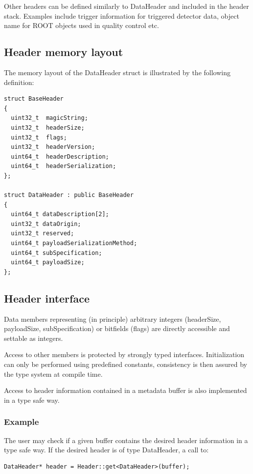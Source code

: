 \documentclass[a4paper,twoside]{article}
\begin{document}
Other headers can be defined similarly to DataHeader and included in the header stack. Examples include trigger information for triggered detector data, object name for ROOT objects used in quality control etc.

\subsection{Header memory layout}
The memory layout of the DataHeader struct is illustrated by the following definition:

\lstset{language=C++
}
\begin{lstlisting}
struct BaseHeader
{
  uint32_t  magicString;
  uint32_t  headerSize;
  uint32_t  flags;
  uint32_t  headerVersion;
  uint64_t  headerDescription;
  uint64_t  headerSerialization;
};

struct DataHeader : public BaseHeader
{
  uint64_t dataDescription[2];
  uint32_t dataOrigin;
  uint32_t reserved;
  uint64_t payloadSerializationMethod;
  uint64_t subSpecification;
  uint64_t payloadSize;
};

\end{lstlisting}

\subsection{Header interface}

Data members representing (in principle) arbitrary integers (headerSize, payloadSize, subSpecification) or bitfields (flags) are directly accessible and settable as integers.

Access to other members is protected by strongly typed interfaces. Initialization can only be performed using predefined constants, consistency is then assured by the type system at compile time.

Access to header information contained in a metadata buffer is also implemented in a type safe way.

\subsubsection{Example}
The user may check if a given buffer contains the desired header information in a type safe way. If the desired header is of type DataHeader, a call to:
\begin{lstlisting}
DataHeader* header = Header::get<DataHeader>(buffer);
\end{lstlisting}
\end{document}
